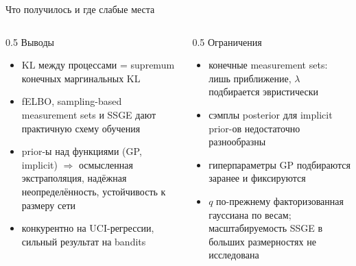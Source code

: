 \documentclass[aspectratio=169,9pt]{beamer}
\newcommand{\KL}{\mathrm{KL}}
\begin{document}
\begin{frame}{Что получилось и где слабые места}
  \begin{columns}[T]
    \begin{column}{0.5\textwidth}
      \textcolor{structure}{Выводы}
      \begin{itemize}
        \item $\KL$ между процессами = supremum конечных маргинальных KL
        \item fELBO, sampling-based measurement sets и SSGE дают практичную схему обучения
        \item prior-ы над функциями (GP, implicit) $\Rightarrow$ осмысленная экстраполяция, надёжная неопределённость, устойчивость к размеру сети
        \item конкурентно на UCI-регрессии, сильный результат на bandits
      \end{itemize}
    \end{column}
    \begin{column}{0.5\textwidth}
      \textcolor{structure}{Ограничения}
      \begin{itemize}
        \item конечные measurement sets: лишь приближение, $\lambda$ подбирается эвристически
        \item сэмплы posterior для implicit prior-ов недостаточно разнообразны
        \item гиперпараметры GP подбираются заранее и фиксируются
        \item $q$ по-прежнему факторизованная гауссиана по весам; масштабируемость SSGE в больших размерностях не исследована
      \end{itemize}
    \end{column}
  \end{columns}
\end{frame}
\end{document}
